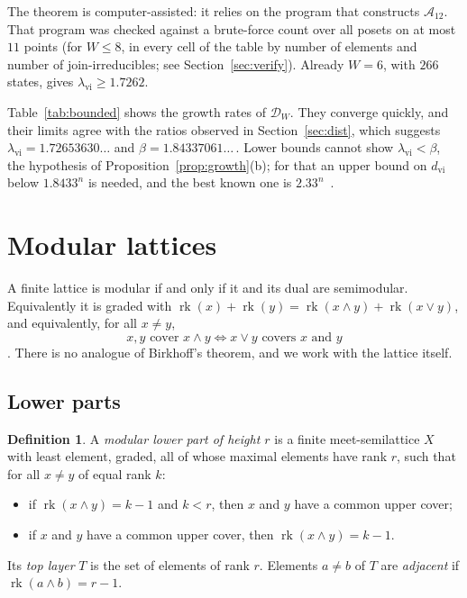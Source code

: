 \documentclass[11pt]{amsart}
\theoremstyle{definition}
\newtheorem{definition}[theorem]{Definition}
\theoremstyle{remark}
\newcommand{\rk}{\operatorname{rk}}
\begin{document}
The theorem is computer-assisted: it relies on the program that constructs $\mathcal{A}_{12}$.
That program was checked against a brute-force count over all posets on at most $11$ points
(for $W \le 8$, in every cell of the table by number of elements and number of
join-irreducibles; see Section~\ref{sec:verify}).  Already $W = 6$, with $266$ states, gives
$\lambda_{\mathrm{vi}} \ge 1.7262$.

\boundedtable

Table~\ref{tab:bounded} shows the growth rates of $\mathcal{D}_W$.  They converge quickly, and
their limits agree with the ratios observed in Section~\ref{sec:dist}, which suggests
$\lambda_{\mathrm{vi}} = 1.72653630\ldots$ and $\beta = 1.84337061\ldots$\,.  Lower bounds
cannot show $\lambda_{\mathrm{vi}} < \beta$, the hypothesis of
Proposition~\ref{prop:growth}(b); for that an upper bound on $d_{\mathrm{vi}}$ below
$1.8433^n$ is needed, and the best known one is $2.33^n$~\cite{EHR}.

\section{Modular lattices}\label{sec:mod}

A finite lattice is modular if and only if it and its dual are semimodular.  Equivalently
it is graded with $\rk(x)+\rk(y) = \rk(x \wedge y) + \rk(x \vee y)$, and equivalently, for all
$x \ne y$,
\begin{equation}\label{eq:cover}
  x,y \text{ cover } x \wedge y \iff x \vee y \text{ covers } x \text{ and } y
\end{equation}
\cite[Section~3.3]{Stanley}.  There is no analogue of Birkhoff's theorem, and we work with
the lattice itself.

\subsection{Lower parts}
\begin{definition}
A \emph{modular lower part of height $r$} is a finite meet-semilattice $X$ with least
element, graded, all of whose maximal elements have rank $r$, such that for all
$x \ne y$ of equal rank $k$:
\begin{itemize}
\item[(U)] if $\rk(x \wedge y) = k-1$ and $k < r$, then $x$ and $y$ have a common upper cover;
\item[(D)] if $x$ and $y$ have a common upper cover, then $\rk(x \wedge y) = k-1$.
\end{itemize}
Its \emph{top layer} $T$ is the set of elements of rank $r$.  Elements $a \ne b$ of $T$ are
\emph{adjacent} if $\rk(a \wedge b) = r-1$.
\end{definition}
\end{document}
